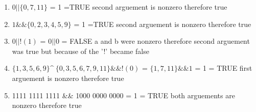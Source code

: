 \documentclass[11pt]{article}
\begin{document}
\begin{enumerate}
\begin{enumerate}
	\item $0 || \{0,7,11\}$ = 1 =TRUE \newline *second arguement is nonzero therefore true 
	\item $1 \&\& \{0,2,3,4,5,9\}$ = 1 =TRUE \newline *second arguement is nonzero therefore true 
	\item $0 || !(1)$ = $0 || 0$ = FALSE \newline *a and b were nonzero therefore second arguement was true but because of the '!' became false 
	\item $\{1,3,5,6,9\} \^ \  \{0,3,5,6,7,9,11\} \&\& !(0)$ = $\{1,7,11\} \&\& 1$ = 1 = TRUE \newline *first arguement is nonzero therefore true 
	\item 1111 1111 1111 \&\& 1000 0000 0000 = 1 = TRUE \newline * both arguements are nonzero therefore true 
\end{enumerate}

\end{enumerate}
\end{document}
